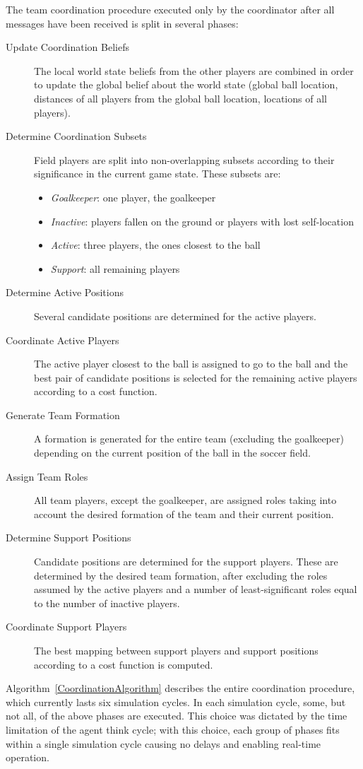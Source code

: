 The team coordination procedure executed only by the coordinator after all messages have been received is split in several phases:
\begin{description}
\item[Update Coordination Beliefs] The local world state beliefs from the other players are combined in order to update the global belief about the world state (global ball location, distances of all players from the global ball location, locations of all players). 
\item[Determine Coordination Subsets] Field players are split into non-overlapping subsets according to their significance in the current game state. These subsets are:
\begin{itemize}
\item \textit{Goalkeeper}: one player, the goalkeeper
\item \textit{Inactive}: players fallen on the ground or players with lost self-location
\item \textit{Active}: three players, the ones closest to the ball
\item \textit{Support}: all remaining players
\end{itemize}
\item[Determine Active Positions] Several candidate positions are determined for the active players.
\item[Coordinate Active Players] The active player closest to the ball is assigned to go to the ball and the best pair of candidate positions is selected for the remaining active players according to a cost function.
\item[Generate Team Formation] A formation is generated for the entire team (excluding the goalkeeper) depending on the current position of the ball in the soccer field.
\item[Assign Team Roles] All team players, except the goalkeeper, are assigned roles taking into account the desired  formation of the team and their current position.
\item[Determine Support Positions]  Candidate positions are determined for the support players. These are determined by the desired team formation, after excluding the roles assumed by the active players and a number of least-significant roles equal to the number of inactive players. 
\item[Coordinate Support Players] The best mapping between support players and support positions according to a cost function is computed.
\end{description}
Algorithm~\ref{CoordinationAlgorithm} describes the entire coordination procedure, which currently lasts six simulation cycles. In each simulation cycle, some, but not all, of the above phases are executed. This choice was dictated by the time limitation of the agent think cycle; with this choice, each group of phases fits within a single simulation cycle causing no delays and enabling real-time operation. 

